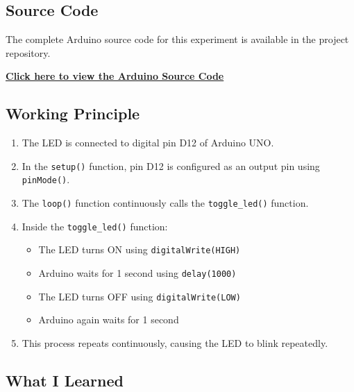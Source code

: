 
\subsection{Source Code}

The complete Arduino source code for this experiment is available in the project repository.

\href{https://github.com/YOUR_USERNAME/YOUR_REPOSITORY/blob/main/Exp-0/led_flash/led_flash.ino}
{\textbf{Click here to view the Arduino Source Code}}


\subsection{Working Principle}

\begin{enumerate}
    \item The LED is connected to digital pin D12 of Arduino UNO.

    \item In the \texttt{setup()} function, pin D12 is configured as an output pin using \texttt{pinMode()}.

    \item The \texttt{loop()} function continuously calls the \texttt{toggle\_led()} function.

    \item Inside the \texttt{toggle\_led()} function:
    \begin{itemize}
        \item The LED turns ON using \texttt{digitalWrite(HIGH)}
        \item Arduino waits for 1 second using \texttt{delay(1000)}
        \item The LED turns OFF using \texttt{digitalWrite(LOW)}
        \item Arduino again waits for 1 second
    \end{itemize}

    \item This process repeats continuously, causing the LED to blink repeatedly.
\end{enumerate}


\subsection{What I Learned}

